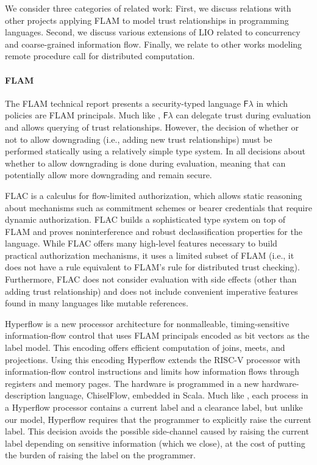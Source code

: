 We consider three categories of related work: First, we discuss relations with other projects applying FLAM to model trust relationships in programming languages. Second, we discuss various extensions of LIO related to concurrency and coarse-grained information flow. Finally, we relate \lang{} to other works modeling remote procedure call for distributed computation.

\paragraph{FLAM}
The FLAM technical report \cite{flamtr} presents a security-typed language $\mathsf{F}\lambda$ in which policies are FLAM principals. Much like \lang{}, $\mathsf{F}\lambda$ can delegate trust during evaluation and allows querying of trust relationships. However, the decision of whether or not to allow downgrading (i.e., adding new trust relationships) must be performed statically using a relatively simple type system. In \lang{} all decisions about whether to allow downgrading is done during evaluation, meaning that \lang{} can potentially allow more downgrading and remain secure.

FLAC \cite{7536372} is a calculus for flow-limited authorization, which allows static reasoning about mechanisms such as commitment schemes or bearer credentials that require dynamic authorization. FLAC builds a sophisticated type system on top of FLAM and proves noninterference and robust declassification properties for the language. While FLAC offers many high-level features necessary to build practical authorization mechanisms, it uses a limited subset of FLAM (i.e., it does not have a rule equivalent to FLAM's  rule for distributed trust checking). Furthermore, FLAC does not consider evaluation with side effects (other than adding trust relationship) and does not include convenient imperative features found in many languages like mutable references.

Hyperflow \cite{hyperflow} is a new processor architecture for nonmalleable, timing-sensitive information-flow control that uses FLAM principals encoded as bit vectors as the label model. This encoding offers efficient computation of joins, meets, and projections. Using this encoding Hyperflow extends the RISC-V processor with information-flow control instructions and limits how information flows through registers and memory pages. The hardware is programmed in a new hardware-description language, ChiselFlow, embedded in Scala. Much like \lang{}, each process in a Hyperflow processor contains a current label and a clearance label, but unlike our model, Hyperflow requires that the programmer to explicitly raise the current label. This decision avoids the possible side-channel caused by raising the current label depending on sensitive information (which we close), at the cost of putting the burden of raising the label on the programmer.

